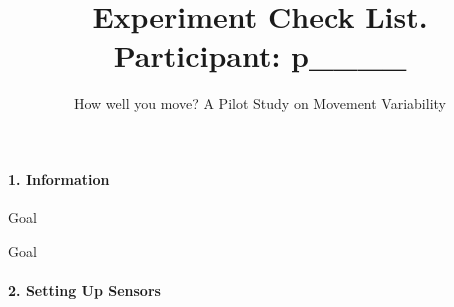\documentclass[a4paper]{article}
\begin{document}
\title{\vspace{-4.0cm}Experiment Check List. Participant: p\_\_\_\_}
\author{How well you move? A Pilot Study on Movement Variability}
\date{}
\maketitle

\thispagestyle{empty} %





\paragraph{1. Information}

\begin{CheckList}{Goal}
\begin{minipage}[t]{0.5\textwidth}
\end{minipage}
\hspace{0.5cm}
\begin{minipage}[t]{0.5\textwidth}
\end{minipage}
\end{CheckList}


\vspace{-2mm}

\begin{CheckList}{Goal}
\begin{minipage}[t]{0.5\textwidth}
\end{minipage}
\hspace{0.5cm}
\begin{minipage}[t]{0.5\textwidth}
\end{minipage}
\end{CheckList}



\paragraph{2. Setting Up Sensors}


\hspace{2cm}
\end{document}
